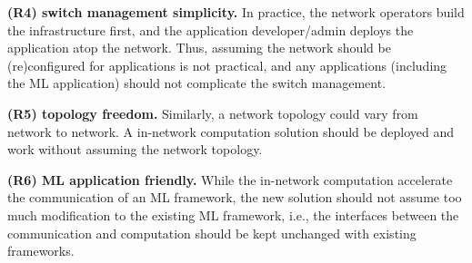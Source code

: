 \textbf{(R4) switch management simplicity.} In practice, the network operators build the infrastructure first, and the application developer/admin deploys the application atop the network. Thus, assuming the network should be (re)configured for applications is not practical, and any applications (including the ML application) should not complicate the switch management.

\textbf{(R5) topology freedom.} Similarly, a network topology could vary from network to network. A in-network computation solution should be deployed and work without assuming the network topology.

\textbf{(R6) ML application friendly.} While the in-network computation accelerate the communication of an ML framework, the new solution should not assume too much modification to the existing ML framework, i.e., the interfaces between the communication and computation should be kept unchanged with existing frameworks.


















